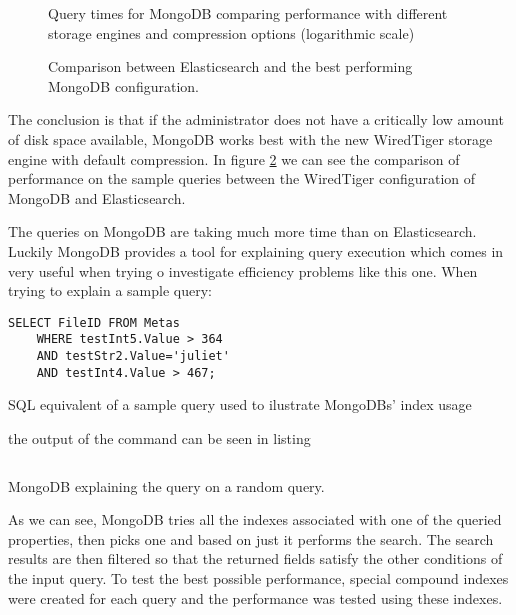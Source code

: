 \begin{figure}[h]
	\centering
	
	\caption{Query times for MongoDB comparing performance with different storage engines and compression 
	options (logarithmic scale)}
	\label{fig:MDBcomparison}
\end{figure}

\begin{figure}[h]
	\centering
	
	\caption{Comparison between Elasticsearch and the best performing MongoDB configuration.}
	\label{fig:DBscomparison}
\end{figure}

The conclusion is that if the administrator does not have a critically low amount of disk space available, MongoDB
works best with the new WiredTiger storage engine with default compression. In figure \ref{fig:DBscomparison} we 
can see the comparison of performance on the sample queries between the WiredTiger configuration of MongoDB and 
Elasticsearch. 



The queries on MongoDB are taking much more time than on Elasticsearch. Luckily MongoDB provides
a tool for explaining query execution which comes in very useful when trying o investigate efficiency problems
like this one. When trying to explain a sample query:

\begin{listing}
\begin{verbatim}
SELECT FileID FROM Metas 
	WHERE testInt5.Value > 364 
	AND testStr2.Value='juliet' 
	AND testInt4.Value > 467;
\end{verbatim}
\caption{SQL equivalent of a sample query used to ilustrate MongoDBs' index usage}
\end{listing}

\noindent the output of the command can be seen in listing %

\begin{listing}
\begin{verbatim}

\end{verbatim}
\caption{MongoDB explaining the query on a random query.}
\end{listing}

As we can see, MongoDB tries all the indexes associated with one of the queried properties, then picks one and 
based on just it performs the search. The search results are then filtered so that the returned fields satisfy the
other conditions of the input query. To test the best possible performance, special compound indexes were created 
for each query and the performance was tested using these indexes. 

